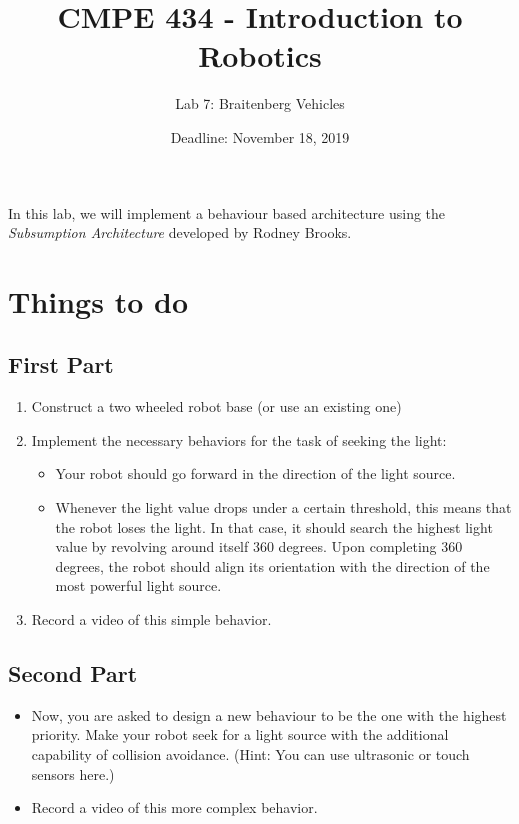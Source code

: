 \documentclass{scrartcl}
\title{CMPE 434 - Introduction to Robotics}
\subtitle{Lab 7: Braitenberg Vehicles}
\date{Deadline: November 18, 2019}
\begin{document}
\maketitle

In this lab, we will implement a behaviour based architecture using the \emph{Subsumption Architecture} developed by Rodney Brooks.

\section{Things to do}

\subsection{First Part}
\begin{enumerate}
    \def\labelenumi{\arabic{enumi}.}
    \item Construct a two wheeled robot base (or use an existing one)
    \item Implement the necessary behaviors for the task of seeking the light:
    
    \begin{itemize} 
        \item Your robot should go forward in the direction of the light source.
	    \item Whenever the light value drops under a certain threshold, this means that the robot loses the light. In that case, it should search the highest light value by revolving around itself 360 degrees. Upon completing 360 degrees, the robot should align its orientation with the direction of the most powerful light source.
    \end{itemize}
    \item  Record a video of this simple behavior.
\end{enumerate}

\subsection{Second Part}
\begin{itemize}
    \item Now, you are asked to design a new behaviour to be the one with the highest priority. Make your robot seek for a light source with the additional capability of collision avoidance. (Hint: You can use ultrasonic or touch sensors here.)
    \item  Record a video of this more complex behavior.
\end{itemize}
\end{document}
